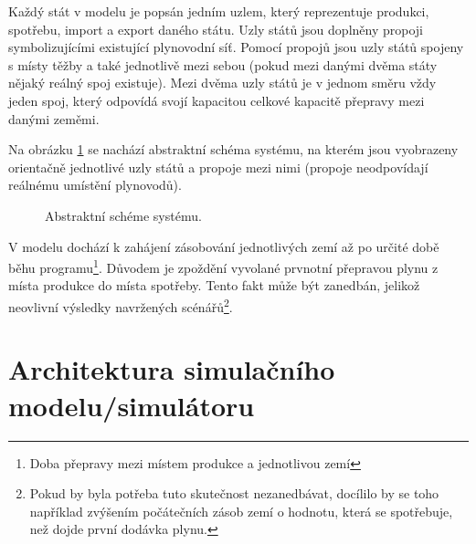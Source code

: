 \documentclass[a4paper,11pt]{article}
\begin{document}
Každý stát v modelu je popsán jedním uzlem, který reprezentuje produkci, spotřebu, import a export daného státu.
Uzly států jsou doplněny propoji symbolizujícími existující plynovodní síť.
Pomocí propojů jsou uzly států spojeny s místy těžby a také jednotlivě mezi sebou
(pokud mezi danými dvěma státy nějaký reálný spoj existuje).
Mezi dvěma uzly států je v jednom směru vždy jeden spoj,
který odpovídá svojí kapacitou celkové kapacitě přepravy mezi danými zeměmi.

Na obrázku \ref{evropa} se nachází abstraktní schéma systému, na kterém jsou vyobrazeny orientačně jednotlivé uzly států
a propoje mezi nimi (propoje neodpovídají reálnému umístění plynovodů).

\begin{figure}[h!]
\begin{center}
\end{center}
\caption{Abstraktní schéme systému.}
\label{evropa}
\end{figure}

V modelu dochází k zahájení zásobování jednotlivých zemí až po určité době běhu
programu\footnote{Doba přepravy mezi místem produkce a jednotlivou zemí}.
Důvodem je zpoždění vyvolané prvnotní přepravou plynu z místa produkce do místa spotřeby.
Tento fakt může být zanedbán, jelikož neovlivní výsledky navržených
scénářů\footnote{Pokud by byla potřeba tuto skutečnost nezanedbávat,
docílilo by se toho například zvýšením počátečních zásob zemí o hodnotu,
která se spotřebuje, než dojde první dodávka plynu.}.

\section{Architektura simulačního modelu/simulátoru}
\end{document}
